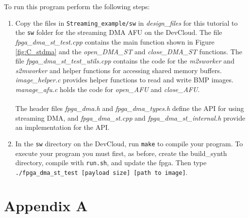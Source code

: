 \documentclass[11pt, twoside, pdftex]{article}
\begin{document}
 \\
 ~\\
 To run this program perform the following steps:
 \begin{enumerate}
     \item Copy the files in \texttt{Streaming\_example/sw} in {\it design\_files} for this tutorial to the \texttt{sw} folder for the streaming DMA AFU on the DevCloud. The file {\it fpga\_dma\_st\_test.cpp} contains the main function shown in Figure \ref{fig:C_stdma} and the {\it open\_DMA\_ST} and {\it close\_DMA\_ST} functions. The file {\it fpga\_dma\_st\_test\_utils.cpp} contains the code for the {\it m2sworker} and {\it s2mworker} and helper functions for accessing shared memory buffers.  {\it image\_helper.c} provides helper functions to read and write BMP images. {\it manage\_afu.c} holds the code for {\it open\_AFU} and {\it close\_AFU}.\\
     \\
     The header files {\it fpga\_dma.h} and {\it fpga\_dma\_types.h} define the API for using streaming DMA, and {\it fpga\_dma\_st.cpp} and {\it fpga\_dma\_st\_internal.h} provide an implementation for the API.
     
     \item In the \texttt{sw} directory on the DevCloud, run \verb|make| to compile your program. To execute your program you must first, as before, create the build\_synth directory, compile with \texttt{run.sh}, and update the fpga. Then type \verb|./fpga_dma_st_test [payload size] [path to image]|. 
 \end{enumerate}
 
 \section*{Appendix A}
 
\end{document}
